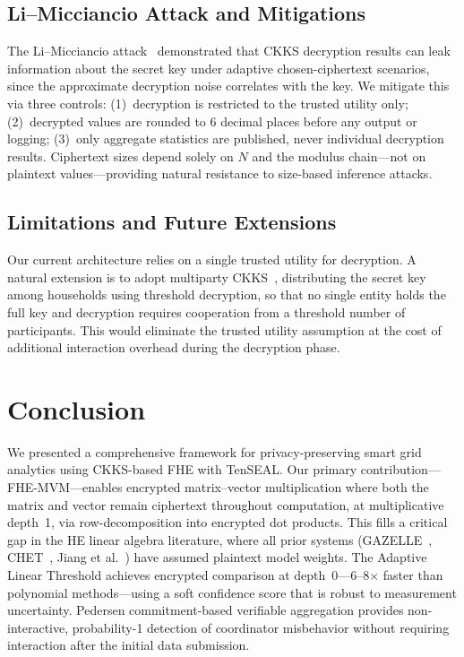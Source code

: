 \documentclass[conference]{IEEEtran}
\begin{document}
\subsection{Li--Micciancio Attack and Mitigations}

The Li--Micciancio attack~\cite{Li2021ckks} demonstrated that CKKS decryption results can leak information about the secret key under adaptive chosen-ciphertext scenarios, since the approximate decryption noise correlates with the key. We mitigate this via three controls: (1)~decryption is restricted to the trusted utility only; (2)~decrypted values are rounded to 6 decimal places before any output or logging; (3)~only aggregate statistics are published, never individual decryption results. Ciphertext sizes depend solely on $N$ and the modulus chain---not on plaintext values---providing natural resistance to size-based inference attacks.

\subsection{Limitations and Future Extensions}

Our current architecture relies on a single trusted utility for decryption. A natural extension is to adopt multiparty CKKS~\cite{Mouchet2020}, distributing the secret key among households using threshold decryption, so that no single entity holds the full key and decryption requires cooperation from a threshold number of participants. This would eliminate the trusted utility assumption at the cost of additional interaction overhead during the decryption phase.

\section{Conclusion}
\label{sec:conclusion}

We presented a comprehensive framework for privacy-preserving smart grid analytics using CKKS-based FHE with TenSEAL. Our primary contribution---FHE-MVM---enables encrypted matrix--vector multiplication where both the matrix and vector remain ciphertext throughout computation, at multiplicative depth~1, via row-decomposition into encrypted dot products. This fills a critical gap in the HE linear algebra literature, where all prior systems (GAZELLE~\cite{Juvekar2018}, CHET~\cite{Dathathri2019}, Jiang et al.~\cite{Jiang2018}) have assumed plaintext model weights. The Adaptive Linear Threshold achieves encrypted comparison at depth~0---6--8$\times$ faster than polynomial methods---using a soft confidence score that is robust to measurement uncertainty. Pedersen commitment-based verifiable aggregation provides non-interactive, probability-1 detection of coordinator misbehavior without requiring interaction after the initial data submission.
\end{document}
